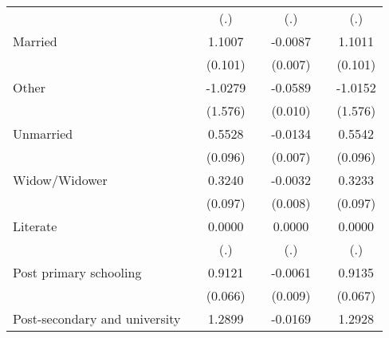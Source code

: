 \begin{table}[htbp]
\begin{tabular}{l*{6}{c}}
                    &                     &         (.)         &                     &         (.)         &                     &         (.)         \\
[1em]
Married             &                     &      1.1007\sym{***}&                     &     -0.0087         &                     &      1.1011\sym{***}\\
                    &                     &     (0.101)         &                     &     (0.007)         &                     &     (0.101)         \\
[1em]
Other               &                     &     -1.0279         &                     &     -0.0589\sym{***}&                     &     -1.0152         \\
                    &                     &     (1.576)         &                     &     (0.010)         &                     &     (1.576)         \\
[1em]
Unmarried           &                     &      0.5528\sym{***}&                     &     -0.0134         &                     &      0.5542\sym{***}\\
                    &                     &     (0.096)         &                     &     (0.007)         &                     &     (0.096)         \\
[1em]
Widow/Widower       &                     &      0.3240\sym{***}&                     &     -0.0032         &                     &      0.3233\sym{***}\\
                    &                     &     (0.097)         &                     &     (0.008)         &                     &     (0.097)         \\
[1em]
Literate            &                     &      0.0000         &                     &      0.0000         &                     &      0.0000         \\
                    &                     &         (.)         &                     &         (.)         &                     &         (.)         \\
[1em]
Post primary schooling&                     &      0.9121\sym{***}&                     &     -0.0061         &                     &      0.9135\sym{***}\\
                    &                     &     (0.066)         &                     &     (0.009)         &                     &     (0.067)         \\
[1em]
Post-secondary and university&                     &      1.2899\sym{***}&                     &     -0.0169         &                     &      1.2928\sym{***}\\

\end{tabular}
\end{table}

